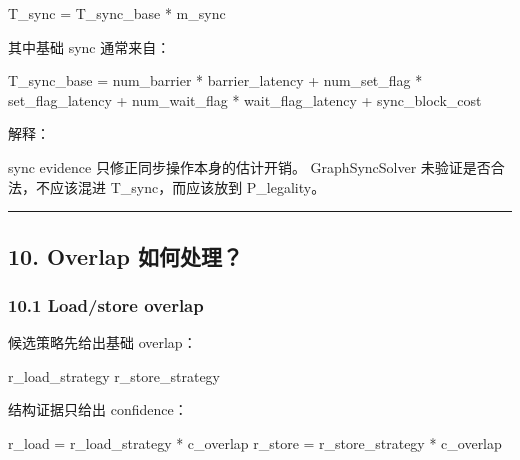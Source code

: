\documentclass[
  10pt,
]{article}
\newenvironment{Shaded}{}{}
\newcommand{\NormalTok}[1]{#1}
\begin{document}
\begin{Shaded}
\begin{Highlighting}[]
\NormalTok{T\_sync = T\_sync\_base * m\_sync}
\end{Highlighting}
\end{Shaded}

其中基础 sync 通常来自：

\begin{Shaded}
\begin{Highlighting}[]
\NormalTok{T\_sync\_base =}
\NormalTok{    num\_barrier * barrier\_latency}
\NormalTok{  + num\_set\_flag * set\_flag\_latency}
\NormalTok{  + num\_wait\_flag * wait\_flag\_latency}
\NormalTok{  + sync\_block\_cost}
\end{Highlighting}
\end{Shaded}

解释：

\begin{Shaded}
\begin{Highlighting}[]
\NormalTok{sync evidence 只修正同步操作本身的估计开销。}
\NormalTok{GraphSyncSolver 未验证是否合法，不应该混进 T\_sync，而应该放到 P\_legality。}
\end{Highlighting}
\end{Shaded}

\begin{center}\rule{0.5\linewidth}{0.5pt}\end{center}

\subsection{10. Overlap
如何处理？}\label{overlap-ux5982ux4f55ux5904ux7406}

\subsubsection{10.1 Load/store overlap}\label{loadstore-overlap}

候选策略先给出基础 overlap：

\begin{Shaded}
\begin{Highlighting}[]
\NormalTok{r\_load\_strategy}
\NormalTok{r\_store\_strategy}
\end{Highlighting}
\end{Shaded}

结构证据只给出 confidence：

\begin{Shaded}
\begin{Highlighting}[]
\NormalTok{r\_load  = r\_load\_strategy  * c\_overlap}
\NormalTok{r\_store = r\_store\_strategy * c\_overlap}
\end{Highlighting}
\end{Shaded}
\end{document}
